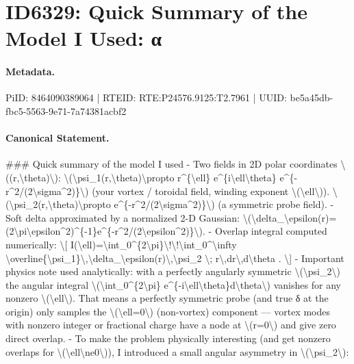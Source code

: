 \section*{ID6329: Quick Summary of the Model I Used: α}
\paragraph{Metadata.}
PiID: 8464090389064 | RTEID: RTE:P24576.9125:T2.7961 | UUID: be5a45db-fbc5-5563-9e71-7a74381acbf2

\paragraph{Canonical Statement.}
\#\#\# Quick summary of the model I used - Two fields in 2D polar coordinates \textbackslash{}((r,\textbackslash{}theta)\textbackslash{}): \textbackslash{}(\textbackslash{}psi\_1(r,\textbackslash{}theta)\textbackslash{}propto r\textasciicircum{}\{\textbackslash{}ell\} e\textasciicircum{}\{i\textbackslash{}ell\textbackslash{}theta\} e\textasciicircum{}\{-r\textasciicircum{}2/(2\textbackslash{}sigma\textasciicircum{}2)\}\textbackslash{}) (your vortex / toroidal field, winding exponent \textbackslash{}(\textbackslash{}ell\textbackslash{})). \textbackslash{}(\textbackslash{}psi\_2(r,\textbackslash{}theta)\textbackslash{}propto e\textasciicircum{}\{-r\textasciicircum{}2/(2\textbackslash{}sigma\textasciicircum{}2)\}\textbackslash{}) (a symmetric probe field). - Soft delta approximated by a normalized 2-D Gaussian: \textbackslash{}(\textbackslash{}delta\_\textbackslash{}epsilon(r)=(2\textbackslash{}pi\textbackslash{}epsilon\textasciicircum{}2)\textasciicircum{}\{-1\}e\textasciicircum{}\{-r\textasciicircum{}2/(2\textbackslash{}epsilon\textasciicircum{}2)\}\textbackslash{}). - Overlap integral computed numerically: \textbackslash{}[ I(\textbackslash{}ell)=\textbackslash{}int\_0\textasciicircum{}\{2\textbackslash{}pi\}\textbackslash{}!\textbackslash{}!\textbackslash{}int\_0\textasciicircum{}\textbackslash{}infty \textbackslash{}overline\{\textbackslash{}psi\_1\}\textbackslash{},\textbackslash{}delta\_\textbackslash{}epsilon(r)\textbackslash{},\textbackslash{}psi\_2 \textbackslash{}; r\textbackslash{},dr\textbackslash{},d\textbackslash{}theta . \textbackslash{}] - Important physics note used analytically: with a perfectly angularly symmetric \textbackslash{}(\textbackslash{}psi\_2\textbackslash{}) the angular integral \textbackslash{}(\textbackslash{}int\_0\textasciicircum{}\{2\textbackslash{}pi\} e\textasciicircum{}\{-i\textbackslash{}ell\textbackslash{}theta\}d\textbackslash{}theta\textbackslash{}) vanishes for any nonzero \textbackslash{}(\textbackslash{}ell\textbackslash{}). That means a perfectly symmetric probe (and true δ at the origin) only samples the \textbackslash{}(\textbackslash{}ell=0\textbackslash{}) (non-vortex) component — vortex modes with nonzero integer or fractional charge have a node at \textbackslash{}(r=0\textbackslash{}) and give zero direct overlap. - To make the problem physically interesting (and get nonzero overlaps for \textbackslash{}(\textbackslash{}ell\textbackslash{}ne0\textbackslash{})), I introduced a small angular asymmetry in \textbackslash{}(\textbackslash{}psi\_2\textbackslash{}): 